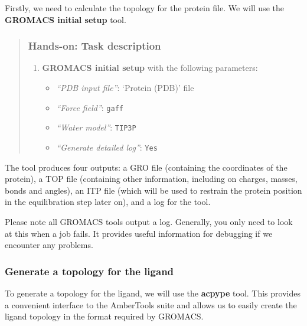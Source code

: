 \documentclass[twocolumn]{bmcart}%
\providecommand{\tightlist}{%
  \setlength{\itemsep}{0pt}\setlength{\parskip}{0pt}}
\providecommand{\tightlist}{%
  \setlength{\itemsep}{0pt}\setlength{\parskip}{0pt}}
\begin{document}
Firstly, we need to calculate the topology for the protein file. We will
use the \textbf{GROMACS initial setup} tool.

\begin{quote}
\subsubsection{Hands-on: Task
description}\label{hands-on-task-description-1}

\begin{enumerate}
\def\labelenumi{\arabic{enumi}.}
\tightlist
\item
  \textbf{GROMACS initial setup} with the following parameters:

  \begin{itemize}
  \tightlist
  \item
    \emph{``PDB input file''}: `Protein (PDB)' file
  \item
    \emph{``Force field''}: \texttt{gaff}
  \item
    \emph{``Water model''}: \texttt{TIP3P}
  \item
    \emph{``Generate detailed log''}: \texttt{Yes}
  \end{itemize}
\end{enumerate}


\end{quote}

The tool produces four outputs: a GRO file (containing the coordinates
of the protein), a TOP file (containing other information, including on
charges, masses, bonds and angles), an ITP file (which will be used to
restrain the protein position in the equilibration step later on), and a
log for the tool.

Please note all GROMACS tools output a log. Generally, you only need to
look at this when a job fails. It provides useful information for
debugging if we encounter any problems.

\subsubsection{Generate a topology for the
ligand}\label{generate-a-topology-for-the-ligand}

To generate a topology for the ligand, we will use the \textbf{acpype}
tool. This provides a convenient interface to the AmberTools suite and
allows us to easily create the ligand topology in the format required by
GROMACS.
\end{document}
